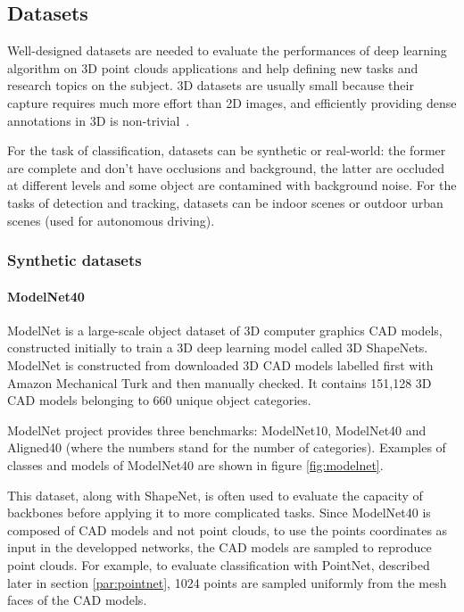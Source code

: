 \subsection{Datasets}
\label{subsec:datasets}

Well-designed datasets are needed to evaluate the performances of deep learning algorithm on 3D point clouds applications and help defining new tasks and research topics on the subject. 3D datasets are usually small because their capture requires much more effort than 2D images, and efficiently providing dense annotations in 3D is non-trivial~\cite{dai2017scannet}.

For the task of classification, datasets can be synthetic or real-world: the former are complete and don't have occlusions and background, the latter are occluded at different levels and some object are contamined with background noise. For the tasks of detection and tracking, datasets can be indoor scenes or outdoor urban scenes (used for autonomous driving).

\subsubsection{Synthetic datasets}

\paragraph{ModelNet40~\cite{ShapeNets}}
\label{ModNet40}
ModelNet is a large-scale object dataset of 3D computer graphics CAD models, constructed initially to train a 3D deep learning model called 3D ShapeNets. ModelNet is constructed from downloaded 3D CAD models labelled first with Amazon Mechanical Turk and then manually checked. It contains 151,128 3D CAD models belonging to 660 unique object categories. 

ModelNet project provides three benchmarks: ModelNet10, ModelNet40 and Aligned40 (where the numbers stand for the number of categories). Examples of classes and models of ModelNet40 are shown in figure \ref{fig:modelnet}.

This dataset, along with ShapeNet, is often used to evaluate the capacity of backbones before applying it to more complicated tasks. Since ModelNet40 is composed of CAD models and not point clouds, to use the points coordinates as input in the developped networks, the CAD models are sampled to reproduce point clouds. For example, to evaluate classification with PointNet, described later in section \ref{par:pointnet}, 1024 points are sampled uniformly from the mesh faces of the CAD models.

